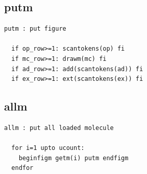 \documentclass[a4paper]{article}
\begin{document}
\subsection{putm}
%
\begin{verbatim}
putm : put figure

  if op_row>=1: scantokens(op) fi
  if mc_row>=1: drawm(mc) fi
  if ad_row>=1: add(scantokens(ad)) fi
  if ex_row>=1: ext(scantokens(ex)) fi
\end{verbatim}
\subsection{allm}
%
\begin{verbatim}
allm : put all loaded molecule

  for i=1 upto ucount:
    beginfigm getm(i) putm endfigm
  endfor
\end{verbatim}
\newpage
\end{document}
